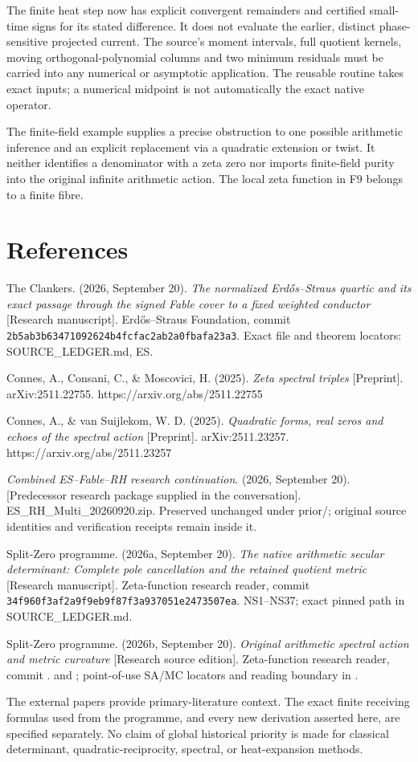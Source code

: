 The finite heat step now has explicit convergent remainders and
certified small-time signs for its stated difference. It does not
evaluate the earlier, distinct phase-sensitive projected current. The
source's moment intervals, full quotient kernels, moving
orthogonal-polynomial columns and two minimum residuals must be carried
into any numerical or asymptotic application. The reusable routine takes
exact inputs; a numerical midpoint is not automatically the exact native
operator.

The finite-field example supplies a precise obstruction to one possible
arithmetic inference and an explicit replacement via a quadratic
extension or twist. It neither identifies a denominator with a zeta zero
nor imports finite-field purity into the original infinite arithmetic
action. The local zeta function in F9 belongs to a finite fibre.

\section{References}\label{references}

The Clankers. (2026, September 20). \emph{The normalized Erdős--Straus
quartic and its exact passage through the signed Fable cover to a fixed
weighted conductor} {[}Research manuscript{]}. Erdős--Straus Foundation,
commit \texttt{2b5ab3b63471092624b4fcfac2ab2a0fbafa23a3}. Exact file and
theorem locators: SOURCE\_LEDGER.md, ES.

Connes, A., Consani, C., \& Moscovici, H. (2025). \emph{Zeta spectral
triples} {[}Preprint{]}. arXiv:2511.22755.
https://arxiv.org/abs/2511.22755

Connes, A., \& van Suijlekom, W. D. (2025). \emph{Quadratic forms, real
zeros and echoes of the spectral action} {[}Preprint{]}.
arXiv:2511.23257. https://arxiv.org/abs/2511.23257

\emph{Combined ES--Fable--RH research continuation}. (2026, September
20). {[}Predecessor research package supplied in the conversation{]}.
ES\_RH\_Multi\_20260920.zip. Preserved unchanged under prior/; original
source identities and verification receipts remain inside it.

Split-Zero programme. (2026a, September 20). \emph{The native arithmetic
secular determinant: Complete pole cancellation and the retained
quotient metric} {[}Research manuscript{]}. Zeta-function research
reader, commit \texttt{34f960f3af2a9f9eb9f87f3a937051e2473507ea}.
NS1--NS37; exact pinned path in SOURCE\_LEDGER.md.

Split-Zero programme. (2026b, September 20). \emph{Original arithmetic
spectral action and metric curvature} {[}Research source edition{]}.
Zeta-function research reader, commit
.
 and
; point-of-use SA/MC locators and
reading boundary in .

The external papers provide primary-literature context. The exact finite
receiving formulas used from the programme, and every new derivation
asserted here, are specified separately. No claim of global historical
priority is made for classical determinant, quadratic-reciprocity,
spectral, or heat-expansion methods.
